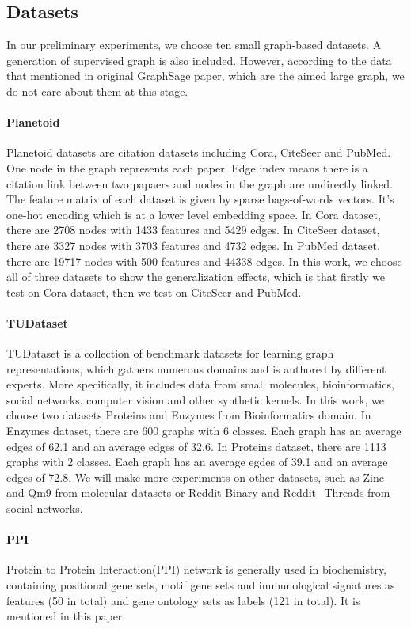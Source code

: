 \documentclass[sigconf]{acmart}
\begin{document}
\subsection{Datasets}
In our preliminary experiments, we choose ten small graph-based datasets. A generation of supervised graph is also included. However, according to the data that mentioned in original GraphSage
paper, which are the aimed large graph, we do not care about them at this stage.
\paragraph{Planetoid}
Planetoid datasets are citation datasets including {\sc Cora}, {\sc CiteSeer} and {\sc PubMed}. One node in the graph represents each paper. Edge index means there is a citation link between two papaers and nodes in the graph are undirectly linked. The feature matrix of each dataset is given by sparse bags-of-words vectors. It's one-hot encoding which is at a lower level embedding space. In  {\sc Cora} dataset, there are 2708 nodes with 1433 features and 5429 edges. In {\sc CiteSeer} dataset, there are 3327 nodes with 3703 features and 4732 edges. In {\sc PubMed} dataset, there are 19717 nodes with 500 features and 44338 edges. In this work, we choose all of three datasets to show the generalization effects, which is that firstly we test on {\sc Cora} dataset, then we test on {\sc CiteSeer} and {\sc PubMed}.

\paragraph{TUDataset}
TUDataset is a collection of benchmark datasets for learning graph representations, which gathers numerous domains and is authored by different experts. More specifically, it includes data from small molecules, bioinformatics, social networks, computer vision and other synthetic kernels. In this work, we choose two datasets  {\sc Proteins} and {\sc Enzymes} from Bioinformatics domain. In {\sc Enzymes} dataset, there are 600 graphs with 6 classes. Each graph has an average edges of 62.1 and an average edges of 32.6. In {\sc Proteins} dataset, there are 1113 graphs with 2 classes. Each graph has an average egdes of 39.1 and an average edges of 72.8. We will make more experiments on other datasets, such as {\sc Zinc} and {\sc Qm9} from molecular datasets or {\sc Reddit-Binary} and {\sc Reddit\_Threads} from social networks. 

\paragraph{PPI}
Protein to Protein Interaction(PPI) network is generally used in biochemistry, containing positional gene sets, motif gene sets and immunological signatures as features (50 in total) and gene ontology sets as labels (121 in total). It is mentioned in this paper. 
\end{document}
